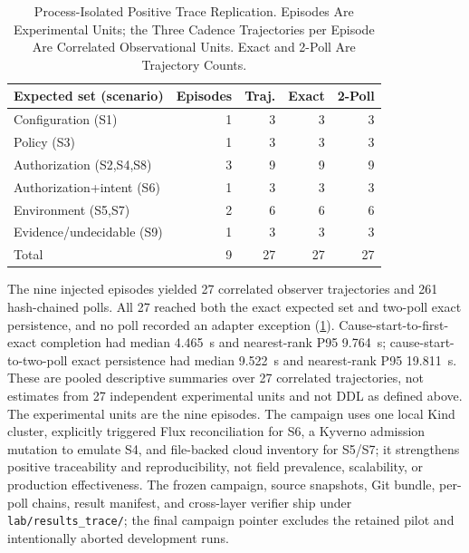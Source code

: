 \begin{table}[t]
\centering
\caption{Process-Isolated Positive Trace Replication. Episodes Are
Experimental Units; the Three Cadence Trajectories per Episode Are Correlated
Observational Units. Exact and 2-Poll Are Trajectory Counts.}
\label{tab:positive-trace}
\scriptsize
\begin{tabular}{lrrrr}
\toprule
Expected set (scenario) & Episodes & Traj. & Exact & 2-Poll \\
\midrule
Configuration (S1) & 1 & 3 & 3 & 3 \\
Policy (S3) & 1 & 3 & 3 & 3 \\
Authorization (S2,S4,S8) & 3 & 9 & 9 & 9 \\
Authorization+intent (S6) & 1 & 3 & 3 & 3 \\
Environment (S5,S7) & 2 & 6 & 6 & 6 \\
Evidence/undecidable (S9) & 1 & 3 & 3 & 3 \\
\midrule
Total & 9 & 27 & 27 & 27 \\
\bottomrule
\end{tabular}
\end{table}

The nine injected episodes yielded 27 correlated observer trajectories and
261 hash-chained polls. All 27 reached both the exact expected set and two-poll
exact persistence, and no poll recorded an adapter exception
(\cref{tab:positive-trace}). Cause-start-to-first-exact completion had median
4.465~s and nearest-rank P95 9.764~s; cause-start-to-two-poll exact persistence
had median 9.522~s and nearest-rank P95 19.811~s. These are pooled descriptive
summaries over 27 correlated trajectories, not estimates from 27 independent
experimental units and not DDL as defined above. The experimental units are
the nine episodes. The campaign uses one local Kind cluster, explicitly
triggered Flux reconciliation for S6, a Kyverno admission mutation to emulate
S4, and file-backed cloud inventory for S5/S7; it strengthens positive
traceability and reproducibility, not field prevalence, scalability, or
production effectiveness. The frozen campaign, source snapshots, Git bundle,
per-poll chains, result manifest, and cross-layer verifier ship under
\texttt{lab/results\_trace/}; the final campaign pointer excludes the retained
pilot and intentionally aborted development runs.

